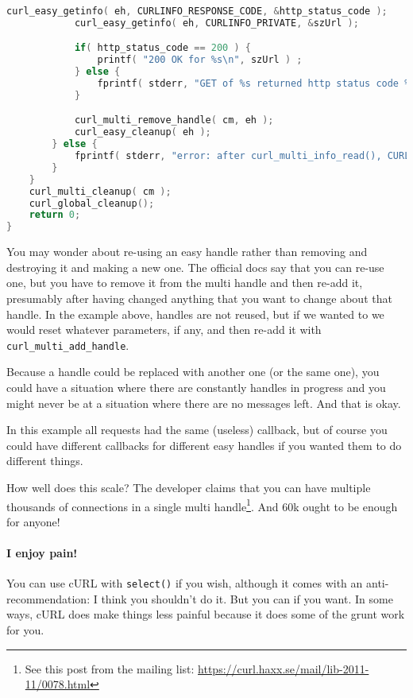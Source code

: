 \begin{lstlisting}[language=C]
            curl_easy_getinfo( eh, CURLINFO_RESPONSE_CODE, &http_status_code );
            curl_easy_getinfo( eh, CURLINFO_PRIVATE, &szUrl );

            if( http_status_code == 200 ) {
                printf( "200 OK for %s\n", szUrl ) ;
            } else {
                fprintf( stderr, "GET of %s returned http status code %d\n", szUrl, http_status_code );
            }

            curl_multi_remove_handle( cm, eh );
            curl_easy_cleanup( eh );
        } else {
            fprintf( stderr, "error: after curl_multi_info_read(), CURLMsg=%d\n", msg->msg );
        }
    }
    curl_multi_cleanup( cm );
    curl_global_cleanup();
    return 0;
}
\end{lstlisting}

You may wonder about re-using an easy handle rather than removing and destroying it and making a new one. The official docs say that you can re-use one, but you have to remove it from the multi handle and then re-add it, presumably after having changed anything that you want to change about that handle. In the example above, handles are not reused, but if we wanted to we would reset whatever parameters, if any, and then re-add it with \texttt{curl\_multi\_add\_handle}.

Because a handle could be replaced with another one (or the same one), you could have a situation where there are constantly handles in progress and you might never be at a situation where there are no messages left. And that is okay.

In this example all requests had the same (useless) callback, but of course you could have different callbacks for different easy handles if you wanted them to do different things.

How well does this scale? The developer claims that you can have multiple thousands of connections in a single multi handle\footnote{See this post from the mailing list: \url{https://curl.haxx.se/mail/lib-2011-11/0078.html}}. And 60k ought to be enough for anyone!

\paragraph{I enjoy pain!} You can use cURL with \texttt{select()} if you wish, although it comes with an anti-recommendation: I think you shouldn't do it. But you can if you want. In some ways, cURL does make things less painful because it does some of the grunt work for you.

